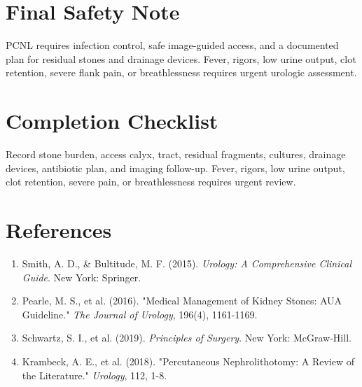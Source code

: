 \section*{Final Safety Note}
PCNL requires infection control, safe image-guided access, and a documented plan for residual stones and drainage devices. Fever, rigors, low urine output, clot retention, severe flank pain, or breathlessness requires urgent urologic assessment.

\section*{Completion Checklist}
Record stone burden, access calyx, tract, residual fragments, cultures, drainage devices, antibiotic plan, and imaging follow-up. Fever, rigors, low urine output, clot retention, severe pain, or breathlessness requires urgent review.

\section*{References}

\begin{enumerate}
    \item Smith, A. D., \& Bultitude, M. F. (2015). \textit{Urology: A Comprehensive Clinical Guide}. New York: Springer.
    
    \item Pearle, M. S., et al. (2016). "Medical Management of Kidney Stones: AUA Guideline." \textit{The Journal of Urology}, 196(4), 1161-1169.
    
    \item Schwartz, S. I., et al. (2019). \textit{Principles of Surgery}. New York: McGraw-Hill.
    
    \item Krambeck, A. E., et al. (2018). "Percutaneous Nephrolithotomy: A Review of the Literature." \textit{Urology}, 112, 1-8.
\end{enumerate}

\clearpage
